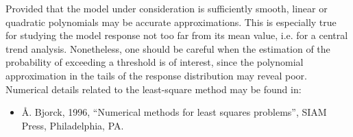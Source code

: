 {
}


{
  Provided that the model under consideration is sufficiently smooth, linear or quadratic polynomials may be accurate approximations. This is especially true for studying the model response not too far from its mean value, i.e. for a central trend analysis. Nonetheless, one should be careful when the estimation of the probability of exceeding a threshold is of interest, since the polynomial approximation in the tails of the response distribution may reveal poor. \\

Numerical details related to the least-square method may be found in:
\begin{itemize}
  \item {\AA}. Bjorck, 1996, ``Numerical methods for least squares problems'', SIAM Press, Philadelphia, PA.
  \end{itemize}
}

